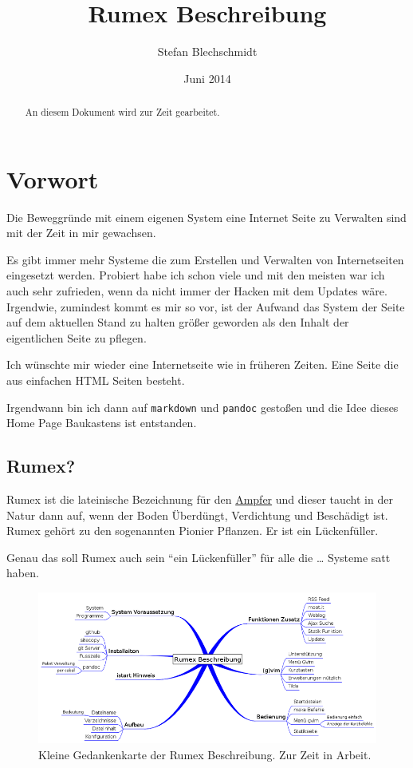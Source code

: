 \documentclass[%
fontsize=12pt,%
parskip=half,%
version=last%
]{scrreprt}
\title{Rumex Beschreibung}
\author{Stefan Blechschmidt}
\date{Juni 2014}
\begin{document}
\VerbatimFootnotes


\maketitle

\begin{abstract}
An diesem Dokument wird zur Zeit gearbeitet.
\end{abstract}

\label{vorwort}
\section{Vorwort}

Die Beweggründe mit einem eigenen System eine Internet Seite zu
Verwalten sind mit der Zeit in mir gewachsen.

Es gibt immer mehr Systeme die zum Erstellen und Verwalten von
Internetseiten eingesetzt werden. Probiert habe ich schon viele und mit
den meisten war ich auch sehr zufrieden, wenn da nicht immer der Hacken
mit dem Updates wäre. Irgendwie, zumindest kommt es mir so vor, ist der
Aufwand das System der Seite auf dem aktuellen Stand zu halten größer
geworden als den Inhalt der eigentlichen Seite zu pflegen.

Ich wünschte mir wieder eine Internetseite wie in früheren Zeiten. Eine
Seite die aus einfachen HTML Seiten besteht.

Irgendwann bin ich dann auf \texttt{markdown} und \texttt{pandoc}
gestoßen und die Idee dieses Home Page Baukastens ist entstanden.




\label{rumex}
\subsection{Rumex?}

Rumex ist die lateinische Bezeichnung für den
\href{http://de.wikipedia.org/wiki/Ampfer}{Ampfer} und dieser taucht in
der Natur dann auf, wenn der Boden Überdüngt, Verdichtung und Beschädigt
ist. Rumex gehört zu den sogenannten Pionier Pflanzen. Er ist ein
Lückenfüller.

Genau das soll Rumex auch sein ``ein Lückenfüller'' für alle die
\ldots{} Systeme satt haben.

\begin{figure}[htbp]
\centering
\includegraphics{../bilder/beschreibung-vym_800_.png}
\caption{Kleine Gedankenkarte der Rumex Beschreibung. Zur Zeit in
Arbeit.}
\end{figure}
\end{document}
